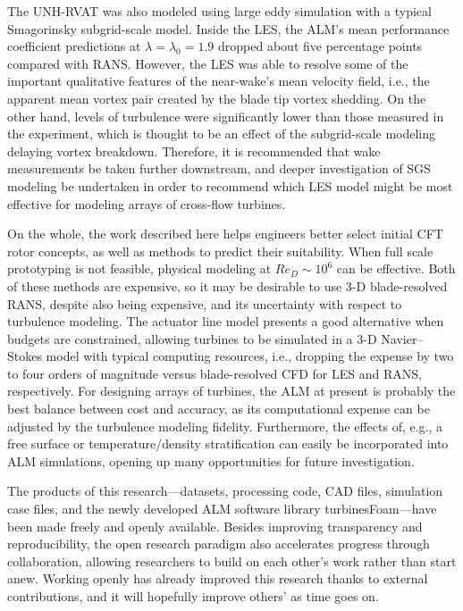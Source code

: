 The UNH-RVAT was also modeled using large eddy simulation with a typical
Smagorinsky subgrid-scale model. Inside the LES, the ALM's mean performance
coefficient predictions at $\lambda=\lambda_0=1.9$ dropped about five percentage
points compared with RANS. However, the LES was able to resolve some of the
important qualitative features of the near-wake's mean velocity field, i.e., the
apparent mean vortex pair created by the blade tip vortex shedding. On the other
hand, levels of turbulence were significantly lower than those measured in the
experiment, which is thought to be an effect of the subgrid-scale modeling
delaying vortex breakdown. Therefore, it is recommended that wake measurements
be taken further downstream, and deeper investigation of SGS modeling be
undertaken in order to recommend which LES model might be most effective for
modeling arrays of cross-flow turbines.

On the whole, the work described here helps engineers better select initial CFT
rotor concepts, as well as methods to predict their suitability. When full scale
prototyping is not feasible, physical modeling at $Re_D \sim 10^6$ can be
effective. Both of these methods are expensive, so it may be desirable to use
3-D blade-resolved RANS, despite also being expensive, and its uncertainty with
respect to turbulence modeling. The actuator line model presents a good
alternative when budgets are constrained, allowing turbines to be simulated in a
3-D Navier--Stokes model with typical computing resources, i.e., dropping the
expense by two to four orders of magnitude versus blade-resolved CFD for LES and
RANS, respectively. For designing arrays of turbines, the ALM at present is
probably the best balance between cost and accuracy, as its computational
expense can be adjusted by the turbulence modeling fidelity. Furthermore, the
effects of, e.g., a free surface or temperature/density stratification can
easily be incorporated into ALM simulations, opening up many opportunities for
future investigation.

The products of this research---datasets, processing code, CAD files, simulation
case files, and the newly developed ALM software library turbinesFoam---have
been made freely and openly available. Besides improving transparency and
reproducibility, the open research paradigm also accelerates progress through
collaboration, allowing researchers to build on each other's work rather than
start anew. Working openly has already improved this research thanks to external
contributions, and it will hopefully improve others' as time goes on.


